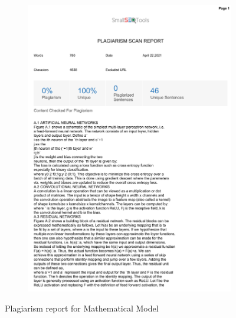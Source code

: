 \documentclass[oneside,a4paper,12pt]{report}
\begin{document}
\begin{appendices}
\begin{figure}
	\begin{subfigure}[H]{\textwidth}
		\centering
    	\includegraphics[scale=0.7, page=1]{plagiarism/mathematical_model.pdf}
    \end{subfigure}
 \caption{Plagiarism report for Mathematical Model}
    \label{PlagiarismMath}
\end{figure}
\begin{figure}\ContinuedFloat
    \begin{subfigure}[H]{\textwidth}
    	\centering

\end{subfigure}
\end{figure}
\end{appendices}
\end{document}
